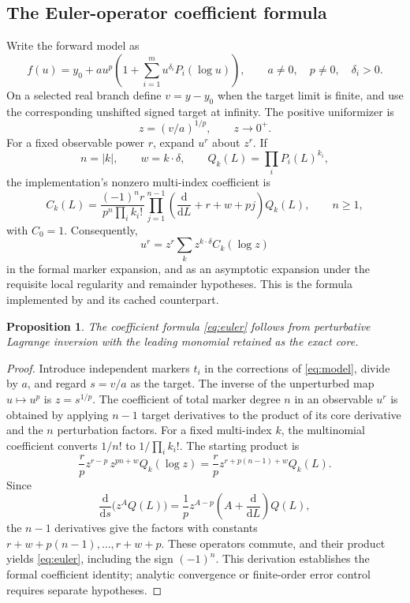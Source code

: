 \documentclass[11pt,a4paper]{article}
\newcommand{\code}[1]{\texttt{\detokenize{#1}}}
\newcommand{\dd}{\mathrm d}
\newtheorem{proposition}{Proposition}[section]
\theoremstyle{remark}\newtheorem{remark}[proposition]{Remark}
\begin{document}
\subsection{The Euler-operator coefficient formula}
Write the forward model as
\begin{equation}\label{eq:model}
 f(u)=y_0+a u^p\left(1+\sum_{i=1}^{m}u^{\delta_i}P_i(\log u)\right),
 \qquad a\ne0,\quad p\ne0,\quad\delta_i>0.
\end{equation}
On a selected real branch define $v=y-y_0$ when the target limit is finite, and use the corresponding unshifted signed target at infinity. The positive uniformizer is
\[
 z=(v/a)^{1/p},\qquad z\to0^+.
\]
For a fixed observable power $r$, expand $u^r$ about $z^r$. If
\[
 n=|k|,\qquad w=k\cdot\delta,\qquad Q_k(L)=\prod_iP_i(L)^{k_i},
\]
the implementation's nonzero multi-index coefficient is
\begin{equation}\label{eq:euler}
 C_k(L)=\frac{(-1)^n r}{p^n\prod_i k_i!}
 \prod_{j=1}^{n-1}\left(\frac{\dd}{\dd L}+r+w+pj\right)Q_k(L),
 \qquad n\ge1,
\end{equation}
with $C_0=1$. Consequently,
\begin{equation}\label{eq:inverseformal}
 u^r=z^r\sum_k z^{k\cdot\delta}C_k(\log z)
\end{equation}
in the formal marker expansion, and as an asymptotic expansion under the requisite local regularity and remainder hypotheses. This is the formula implemented by \code{lagrangeCoefficient} and its cached counterpart.\cite{core,incremental,repoarticle}

\begin{proposition}
The coefficient formula \eqref{eq:euler} follows from perturbative Lagrange inversion with the leading monomial retained as the exact core.
\end{proposition}
\begin{proof}
Introduce independent markers $t_i$ in the corrections of \eqref{eq:model}, divide by $a$, and regard $s=v/a$ as the target. The inverse of the unperturbed map $u\mapsto u^p$ is $z=s^{1/p}$. The coefficient of total marker degree $n$ in an observable $u^r$ is obtained by applying $n-1$ target derivatives to the product of its core derivative and the $n$ perturbation factors. For a fixed multi-index $k$, the multinomial coefficient converts $1/n!$ to $1/\prod_i k_i!$. The starting product is
\[
 \frac r p z^{r-p}\,z^{pn+w}Q_k(\log z)
 =\frac r p z^{r+p(n-1)+w}Q_k(L).
\]
Since
\[
 \frac{\dd}{\dd s}\bigl(z^A Q(L)\bigr)
 =\frac1p z^{A-p}\left(A+\frac{\dd}{\dd L}\right)Q(L),
\]
the $n-1$ derivatives give the factors with constants
$r+w+p(n-1),\ldots,r+w+p$. These operators commute, and their product yields \eqref{eq:euler}, including the sign $(-1)^n$. This derivation establishes the formal coefficient identity; analytic convergence or finite-order error control requires separate hypotheses.
\end{proof}
\end{document}

